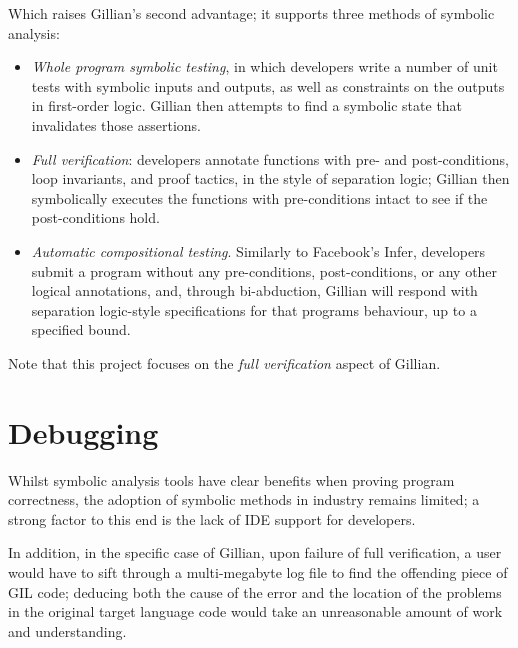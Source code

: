 Which raises Gillian's second advantage; it supports three methods of symbolic
analysis:
\begin{itemize}
  \item \emph{Whole program symbolic testing}, in which developers write a
  number of unit tests with symbolic inputs and outputs, as well as constraints
  on the outputs in first-order logic. Gillian then attempts to find a symbolic
  state that invalidates those assertions.

  \item \emph{Full verification}: developers annotate functions with pre- and
  post-conditions, loop invariants, and proof tactics, in the style of
  separation logic; Gillian then symbolically executes the functions with
  pre-conditions intact to see if the post-conditions hold.

  \item \emph{Automatic compositional testing}. Similarly to Facebook's
  Infer\cite{infer, infer-site}, developers submit a program without any
  pre-conditions, post-conditions, or any other logical annotations, and,
  through bi-abduction\cite{bi-abduction}, Gillian will respond with
  separation logic-style specifications for that programs behaviour, up
  to a specified bound.
\end{itemize}

Note that this project focuses on the \textit{full verification} aspect of
Gillian.


\section{Debugging}
\label{sec:intro:debugging}

Whilst symbolic analysis tools have clear benefits when proving program
correctness, the adoption of symbolic methods in industry remains limited; a
strong factor to this end is the lack of IDE support for
developers\cite{magpiebridge}.

In addition, in the specific case of Gillian, upon failure of full
verification, a user would have to sift through a multi-megabyte log file to
find the offending piece of GIL code; deducing both the cause of the error and
the location of the problems in the original target language code would take an
unreasonable amount of work and understanding\cite{gillian-debugging-2021}.

